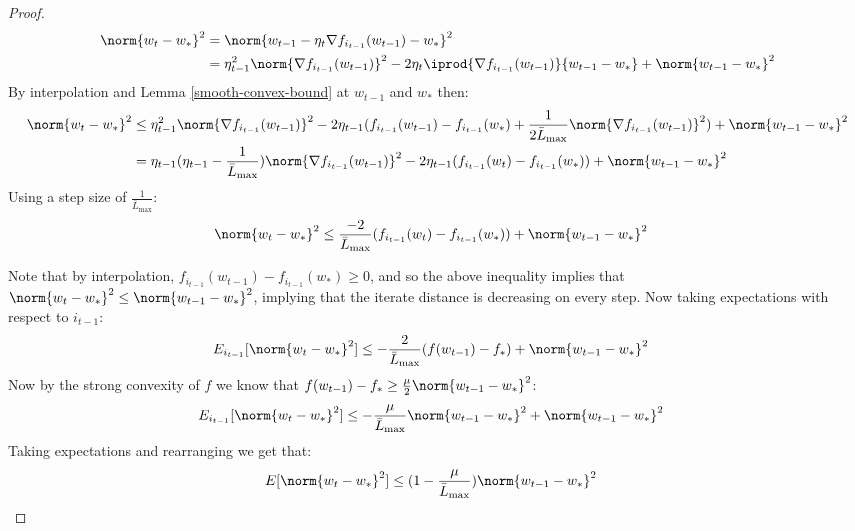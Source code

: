 \documentclass[10pt]{article} %
\begin{document}
\begin{proof}
    \begin{align*}
        \norm{w_{t} - w_*}^2 & = \norm{w_{t-1} - \eta_t \nabla f_{i_{t-1}}(w_{t-1}) - w_*}^2                                                                            \\
                             & = \eta_{t-1}^2\norm{\nabla f_{i_{t-1}}(w_{t-1})}^2 - 2\eta_t \iprod{\nabla f_{i_{t-1}}(w_{t-1})}{w_{t-1} - w_*} + \norm{w_{t-1} - w_*}^2
    \end{align*}
    By interpolation and Lemma \ref{smooth-convex-bound} at $w_{t-1}$ and $w_*$ then:
    \begin{align*}
        \norm{w_{t} - w_*}^2 & \leq \eta_{t-1}^2\norm{\nabla f_{i_{t-1}}(w_{t-1})}^2 - 2\eta_{t-1} (f_{i_{t-1}}(w_{t-1}) - f_{i_{t-1}}(w_*) + \frac{1}{2\bar{L}_{\text{max}}}\norm{\nabla f_{i_{t-1}}(w_{t-1})}^2) + \norm{w_{t-1} - w_*}^2 \\
                             & = \eta_{t-1}(\eta_{t-1} - \frac{1}{\bar{L}_{\text{max}}})\norm{\nabla f_{i_{t-1}}(w_{t-1})}^2 - 2\eta_{t-1}(f_{i_{t-1}}(w_t) - f_{i_{t-1}}(w_*)) + \norm{w_{t-1} - w_*}^2
    \end{align*}
    Using a step size of $\frac{1}{\bar{L}_{\text{max}}}$:
    \begin{align*}
        \norm{w_{t} - w_*}^2 & \leq \frac{-2}{\bar{L}_{\text{max}}}(f_{i_{t-1}}(w_t) - f_{i_{t-1}}(w_*)) + \norm{w_{t-1} - w_*}^2
    \end{align*}

    Note that by interpolation, $f_{i_{t-1}}(w_{t-1}) - f_{i_{t-1}}(w_*) \geq 0$, and so the above inequality implies that $\norm{w_{t} - w_*}^2 \leq \norm{w_{t-1} - w_*}^2$, implying that the iterate distance is decreasing on every step. Now taking expectations with respect to $i_{t-1}$:
    \begin{align*}
        E_{i_{t-1}}[\norm{w_{t} - w_*}^2] & \leq -\frac{2}{\bar{L}_{\text{max}}}(f(w_{t-1}) - f_*) + \norm{w_{t-1} - w_*}^2
    \end{align*}
    Now by the strong convexity of $f$ we know that $f(w_{t-1}) - f_* \geq \frac{\mu}{2}\norm{w_{t-1} - w_*}^2$:
    \begin{align*}
        E_{i_{t-1}}[\norm{w_{t} - w_*}^2] & \leq -\frac{\mu}{\bar{L}_{\text{max}}}\norm{w_{t-1} - w_*}^2 + \norm{w_{t-1} - w_*}^2
    \end{align*}
    Taking expectations and rearranging we get that:
    \begin{align*}
        E[\norm{w_{t} - w_*}^2] & \leq (1 - \frac{\mu}{\bar{L}_{\text{max}}})\norm{w_{t-1} - w_*}^2
    \end{align*}
\end{proof}
\fi
\end{document}
